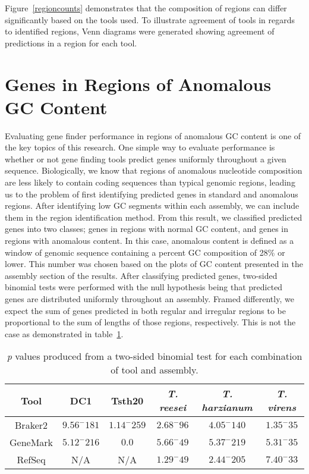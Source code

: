 Figure~\ref{regioncounts} demonstrates that the composition of regions
can differ significantly based on the tools used. To illustrate
agreement of tools in regards to identified regions, Venn diagrams
were generated showing agreement of predictions in a region for each tool.


\section{Genes in Regions of Anomalous GC Content}

Evaluating gene finder performance in regions of anomalous GC content
is one of the key topics of this research. One simple way to evaluate
performance is whether or not gene finding tools predict genes
uniformly throughout a given sequence. Biologically, we know that
regions of anomalous nucleotide composition are less likely to contain
coding sequences than typical genomic regions, leading us to the
problem of first identifying predicted genes in standard and anomalous
regions. After identifying low GC segments within each assembly, we
can include them in the region identification method. From this
result, we classified predicted genes into two classes; genes in
regions with normal GC content, and genes in regions with anomalous
content. In this case, anomalous content is defined as a window of
genomic sequence containing a percent GC composition of 28\% or
lower. This number was chosen based on the plots of GC content
presented in the assembly section of the results. After classifying
predicted genes, two-sided binomial tests were performed with the null
hypothesis being that predicted genes are distributed uniformly
throughout an assembly. Framed differently, we expect the sum of genes
predicted in both regular and irregular regions to be proportional to
the sum of lengths of those regions, respectively. This is not the
case as demonstrated in table~\ref{table:gc-binomial}.

\begin{table}
  \begin{center}
    \begin{tabular}{|c|c|c|c|c|c|}
      \hline
      Tool & DC1 & Tsth20 & \textit{T. reesei} & \textit{T. harzianum} & \textit{T. virens} \\ \hline
      Braker2 & $9.56^-181$ & $1.14^-259$ & $2.68^-96$ & $4.05^-140$ & $1.35^-35$ \\ \hline
      GeneMark & $5.12^-216$ & $0.0$ & $5.66^-49$ & $5.37^-219$ & $5.31^-35$ \\ \hline
      RefSeq & N/A & N/A & $1.29^-49$ & $2.44^-205$ & $7.40^-33$ \\ \hline
    \end{tabular}
  \end{center}
  \caption{\textit{p} values produced from a two-sided binomial test
    for each combination of tool and assembly.}
  \label{table:gc-binomial}
\end{table}

